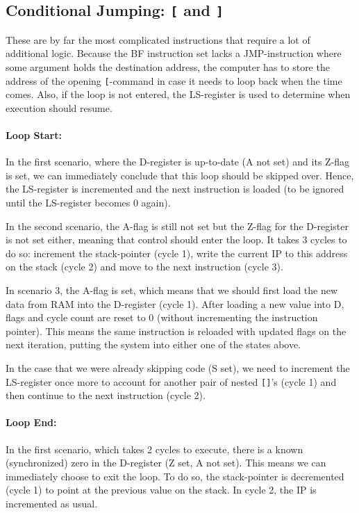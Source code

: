 \subsection{Conditional Jumping: \texttt{[} and \texttt{]}}
These are by far the most complicated instructions that require a lot of additional logic. Because the BF instruction set lacks a JMP-instruction where some argument holds the destination address, the computer has to store the address of the opening \texttt{[}-command in case it needs to loop back when the time comes. Also, if the loop is not entered, the LS-register is used to determine when execution should resume.

\paragraph{Loop Start:}  
In the first scenario, where the D-register is up-to-date (A not set) and its Z-flag is set, we can immediately conclude that this loop should be skipped over. Hence, the LS-register is incremented and the next instruction is loaded (to be ignored until the LS-register becomes 0 again).

In the second scenario, the A-flag is still not set but the Z-flag for the D-register is not set either, meaning that control should enter the loop. It takes 3 cycles to do so: increment the stack-pointer (cycle 1), write the current IP to this address on the stack (cycle 2) and move to the next instruction (cycle 3).

In scenario 3, the A-flag is set, which means that we should first load the new data from RAM into the D-register (cycle 1). After loading a new value into D, flags and cycle count are reset to 0 (without incrementing the instruction pointer). This means the same instruction is reloaded with updated flags on the next iteration, putting the system into either one of the states above.

In the case that we were already skipping code (S set), we need to increment the LS-register once more to account for another pair of nested \texttt{[]}'s (cycle 1) and then continue to the next instruction (cycle 2).

\paragraph{Loop End:}
In the first scenario, which takes 2 cycles to execute, there is a known (synchronized) zero in the D-register (Z set, A not set). This means we can immediately choose to exit the loop. To do so, the stack-pointer is decremented (cycle 1) to point at the previous value on the stack. In cycle 2, the IP is incremented as usual.

